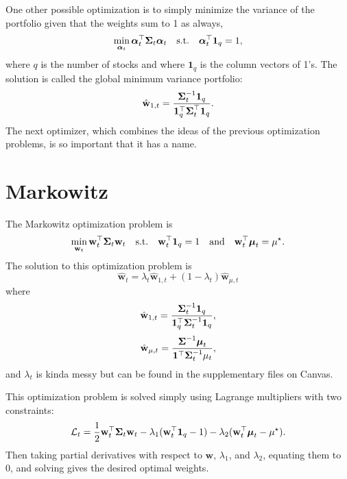 One other possible optimization is to simply minimize the variance of the portfolio given that the weights sum to 1 as always, $$ \min_{\boldsymbol{\alpha}_t}\boldsymbol{\alpha}_t^\top\boldsymbol{\Sigma}_t\boldsymbol{\alpha}_t\quad\text{s.t.}\quad\boldsymbol{\alpha}_t^\top\mathbf 1_q=1, $$ where $q$ is the number of stocks and where $\mathbf 1_q$ is the column vectors of 1's. The solution is called the global minimum variance portfolio: $$ \hat{\mathbf w}_{1,t} = \frac{\boldsymbol{\Sigma}_t^{-1}\mathbf 1_q}{\mathbf 1_q^\top\boldsymbol{\Sigma}_t^\top\mathbf 1_q}. $$ The next optimizer, which combines the ideas of the previous optimization problems, is so important that it has a name.

\section{Markowitz}
The Markowitz optimization problem is $$ \min_{\mathbf w_t}\mathbf w_t^\top\boldsymbol{\Sigma}_t\mathbf w_t\quad\text{s.t.}\quad\mathbf w_t^\top\mathbf 1_q=1\quad\text{and}\quad\mathbf w_t^\top \boldsymbol{\mu}_t=\mu^\star. $$ The solution to this optimization problem is $$ \hat{\mathbf w}_t = \lambda_t\hat{\mathbf w}_{1,t} + (1-\lambda_t)\hat{\mathbf w}_{\mu,t} $$ where $$ \hat{\mathbf w}_{1,t} = \frac{\boldsymbol{\Sigma}_t^{-1}\mathbf 1_q}{\mathbf 1_q^\top\mathbf\Sigma_t^{-1}\mathbf 1_q}, $$ $$ \hat{\mathbf w}_{\mu,t} = \frac{\boldsymbol{\Sigma}^{-1}\boldsymbol{\mu}_t}{\mathbf 1^\top\boldsymbol{\Sigma}_t^{-1}\mathbf\mu_t}, $$ and $\lambda_t$ is kinda messy but can be found in the supplementary files on Canvas.


This optimization problem is solved simply using Lagrange multipliers with two constraints: $$ \mathcal L_t = \frac{1}{2}\mathbf w_t^\top\boldsymbol{\Sigma}_t\mathbf w_t - \lambda_1(\mathbf w_t^\top\mathbf 1_q-1) - \lambda_2(\mathbf w_t^\top\boldsymbol{\mu}_t-\mu^\star). $$ Then taking partial derivatives with respect to $\mathbf w$, $\lambda_1$, and $\lambda_2$, equating them to 0, and solving gives the desired optimal weights.

